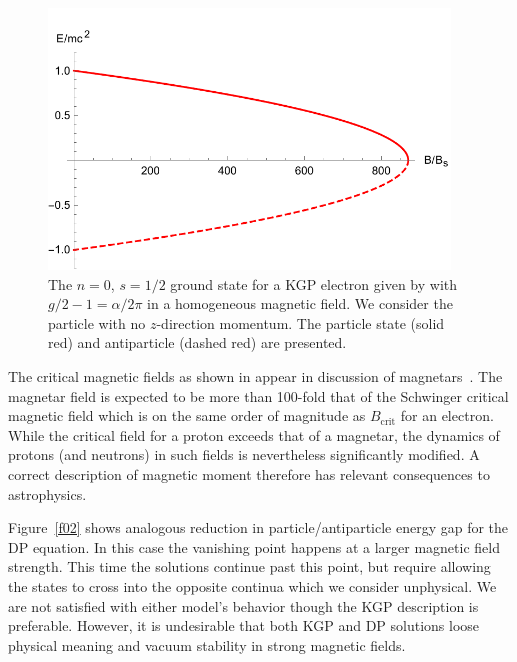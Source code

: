 \begin{figure}[h]
     \centering
     \includegraphics[clip, trim=0.0cm 0.0cm 0.0cm 0.5cm,width=0.95\textwidth]{plots/chap02moment/lanplot01.pdf}
     \caption{The $n=0$, $s=1/2$ ground state for a KGP electron given by  with $g/2-1=\alpha/2\pi$ in a homogeneous magnetic field. We consider the particle with no $z$-direction momentum. The particle state (solid red) and antiparticle (dashed red) are presented.}
     \label{f01}
\end{figure}

The critical magnetic fields as shown in  appear in discussion of magnetars~\citep{Kaspi:2017fwg}. The magnetar field is expected to be more than 100-fold that of the Schwinger critical magnetic field which is on the same order of magnitude as $B_\textrm{crit}$ for an electron. While the critical field for a proton exceeds that of a magnetar, the dynamics of protons (and neutrons) in such fields is nevertheless significantly modified. A correct description of magnetic moment therefore has relevant consequences to astrophysics. 

Figure~\ref{f02} shows analogous reduction in particle/anti\-particle energy gap for the DP equation. In this case the vanishing point happens at a larger magnetic field strength. This time the solutions continue past this point, but require allowing the states to cross into the opposite continua which we consider unphysical. We are not satisfied with either model\rq s behavior though the KGP description is preferable. However, it is undesirable that both KGP and DP solutions loose physical meaning and vacuum stability in strong magnetic fields.

